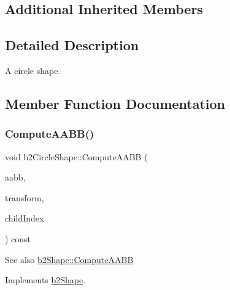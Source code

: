 \subsection*{Additional Inherited Members}


\subsection{Detailed Description}
A circle shape. 

\subsection{Member Function Documentation}
\mbox{\label{classb2CircleShape_a03fdda20d946ec0e5fd00cfd5728f7aa}} 
\subsubsection{\texorpdfstring{Compute\+A\+A\+B\+B()}{ComputeAABB()}\hspace{0.1cm}{\footnotesize\ttfamily [1/2]}}
{\footnotesize\ttfamily void b2\+Circle\+Shape\+::\+Compute\+A\+A\+BB (\begin{DoxyParamCaption}\item[{\hyperlink{structb2AABB}{b2\+A\+A\+BB} $\ast$}]{aabb,  }\item[{const \hyperlink{structb2Transform}{b2\+Transform} \&}]{transform,  }\item[{int32}]{child\+Index }\end{DoxyParamCaption}) const\hspace{0.3cm}{\ttfamily [virtual]}}

\begin{DoxySeeAlso}{See also}
\hyperlink{classb2Shape_a88e9807fab0c8ca9a98d8926e50a1411}{b2\+Shape\+::\+Compute\+A\+A\+BB} 
\end{DoxySeeAlso}


Implements \hyperlink{classb2Shape_a88e9807fab0c8ca9a98d8926e50a1411}{b2\+Shape}.

\mbox{\label{classb2CircleShape_af4a4ea78780af7a7ce40bf5d54affe83}} 
